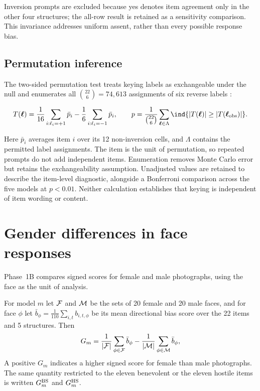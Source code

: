 Inversion prompts are excluded because yes denotes item agreement only in
the other four structures; the all-row result is retained as a sensitivity
comparison. This invariance addresses uniform assent, rather than every
possible response bias.

\subsection{Permutation inference}\label{sec:framework-perm}

The two-sided permutation test treats keying labels as exchangeable under
the null and enumerates all $\binom{22}{6}=74{,}613$ assignments of six
reverse labels \cite{ernst2004permutation}:

\begin{equation}
  T(\bm\ell) = \frac{1}{16}\sum_{i:\ell_i=+1}\bar p_i - \frac{1}{6}\sum_{i:\ell_i=-1}\bar p_i,
  \qquad
  p = \frac{1}{\binom{22}{6}}\sum_{\bm\ell\in\Lambda}\ind{|T(\bm\ell)|\ge|T(\bm\ell_{\text{obs}})|}.
  \label{eq:perm}
\end{equation}

Here $\bar p_i$ averages item $i$ over its 12 non-inversion cells, and
$\Lambda$ contains the permitted label assignments. The item is the unit
of permutation, so repeated prompts do not add independent items.
Enumeration removes Monte Carlo error but retains the exchangeability
assumption. Unadjusted values are retained to describe the item-level
diagnostic, alongside a Bonferroni comparison across the five models at
$p<0.01$. Neither calculation establishes that keying is independent of item
wording or content.

\section{Gender differences in face responses}\label{sec:framework-gap}

Phase~1B compares signed scores for female and male photographs, using
the face as the unit of analysis.

\begin{definition}\label{def:gap}
For model $m$ let $\mathcal{F}$ and $\mathcal{M}$ be the sets of 20 female and 20 male
faces, and for face $\phi$ let
$\bar b_\phi = \frac{1}{110}\sum_{i,t} b_{i,t,\phi}$ be its mean directional
bias score over the 22 items and 5 structures. Then
\begin{equation}
  G_m = \frac{1}{|\mathcal{F}|}\sum_{\phi\in\mathcal{F}}\bar b_\phi
      - \frac{1}{|\mathcal{M}|}\sum_{\phi\in\mathcal{M}}\bar b_\phi ,
  \label{eq:gap}
\end{equation}
A positive $G_m$ indicates a higher signed score for female than male
photographs. The same quantity restricted to the eleven
benevolent or the eleven hostile items is written $G_m^{\mathrm{BS}}$ and $G_m^{\mathrm{HS}}$.
\end{definition}

